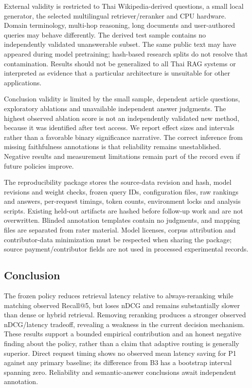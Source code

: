 \documentclass[10pt,a4paper]{article}
\begin{document}
External validity is restricted to Thai Wikipedia-derived questions, a
small local generator, the selected multilingual retriever/reranker and
CPU hardware. Domain terminology, multi-hop reasoning, long documents
and user-authored queries may behave differently. The derived test
sample contains no independently validated unanswerable subset. The same
public text may have appeared during model pretraining; hash-based
research splits do not resolve that contamination. Results should not be
generalized to all Thai RAG systems or interpreted as evidence that a
particular architecture is unsuitable for other applications.

Conclusion validity is limited by the small sample, dependent article
questions, exploratory ablations and unavailable independent answer
judgments. The highest observed ablation score is not an independently
validated new method, because it was identified after test access. We
report effect sizes and intervals rather than a favorable binary
significance narrative. The correct inference from missing faithfulness
annotations is that reliability remains unestablished. Negative results
and measurement limitations remain part of the record even if future
policies improve.

The reproducibility package stores the source-data revision and hash,
model revisions and weight checks, frozen query IDs, configuration
files, raw rankings and answers, per-request timings, token counts,
environment locks and analysis scripts. Existing held-out artifacts are
hashed before follow-up work and are not overwritten. Blinded annotation
templates contain no judgments, and mapping files are separated from
rater material. Model licenses, corpus attribution and contributor-data
minimization must be respected when sharing the package; source
payment/contributor fields are not used in processed experimental
records.

\hypertarget{conclusion}{%
\subsection{Conclusion}\label{conclusion}}

The frozen policy reduces retrieval latency relative to always-reranking
while matching observed Recall@5, but loses nDCG and remains
substantially slower than dense or hybrid retrieval. Removing reranking
produces a stronger observed nDCG/latency tradeoff, revealing a weakness
in the current decision mechanism. These results support a bounded
empirical contribution and an honest negative finding about the policy,
rather than a claim that adaptive routing is generally superior. Direct
request timing shows no observed mean latency saving for P1 against any
primary baseline; its difference from B3 has a bootstrap interval
spanning zero. Reliability and semantic-answer conclusions await
independent annotation.
\end{document}
